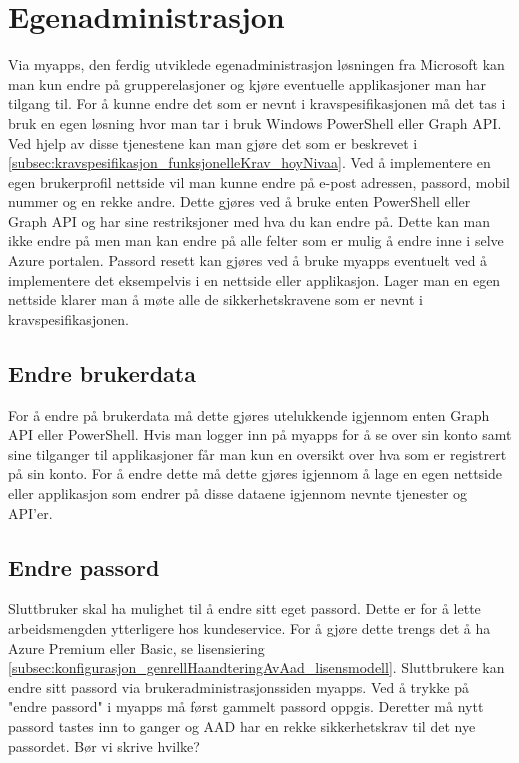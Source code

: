 \section{Egenadministrasjon}
\label{sec:konfigurasjon_egenadministrasjon}
Via myapps, den ferdig utviklede egenadministrasjon løsningen fra Microsoft kan man kun endre på grupperelasjoner og kjøre eventuelle applikasjoner man har tilgang til. For å kunne endre det som er nevnt i kravspesifikasjonen må det tas i bruk en egen løsning hvor man tar i bruk Windows PowerShell eller Graph API. Ved hjelp av disse tjenestene kan man gjøre det som er beskrevet i \ref{subsec:kravspesifikasjon_funksjonelleKrav_hoyNivaa}. Ved å implementere en egen brukerprofil nettside vil man kunne endre på e-post adressen, passord, mobil nummer og en rekke andre. Dette gjøres ved å bruke enten PowerShell eller Graph API og har sine restriksjoner med hva du kan endre på. Dette kan man ikke endre på men man kan endre på alle felter som er mulig å endre inne i selve Azure portalen. Passord resett kan gjøres ved å bruke myapps eventuelt ved å implementere det eksempelvis i en nettside eller applikasjon. Lager man en egen nettside klarer man å møte alle de sikkerhetskravene som er nevnt i kravspesifikasjonen.

\subsection{Endre brukerdata}
\label{subsec:konfigurasjon_egenadministrasjon_endreBrukerdata}
For å endre på brukerdata må dette gjøres utelukkende igjennom enten Graph API eller PowerShell. Hvis man logger inn på myapps for å se over sin konto samt sine tilganger til applikasjoner får man kun en oversikt over hva som er registrert på sin konto. For å endre dette må dette gjøres igjennom å lage en egen nettside eller applikasjon som endrer på disse dataene igjennom nevnte tjenester og API'er.

\subsection{Endre passord}
\label{subsec:konfigurasjon_egenadministrasjon_endrePassord}
Sluttbruker skal ha mulighet til å endre sitt eget passord. Dette er for å lette arbeidsmengden ytterligere hos kundeservice. For å gjøre dette trengs det å ha Azure Premium eller Basic, se lisensiering \ref{subsec:konfigurasjon_genrellHaandteringAvAad_lisensmodell}. Sluttbrukere kan endre sitt passord via brukeradministrasjonssiden myapps. Ved å trykke på "endre passord" i myapps må først gammelt passord oppgis. Deretter må nytt passord tastes inn to ganger og AAD har en rekke sikkerhetskrav til det nye passordet. {\color{blue} Bør vi skrive hvilke?}


